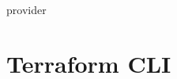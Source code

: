 \documentclass[openany, 12pt]{book}
\begin{document}
\begin{definition}{provider}{}

\end{definition}

\chapter{Terraform CLI}

\end{document}
